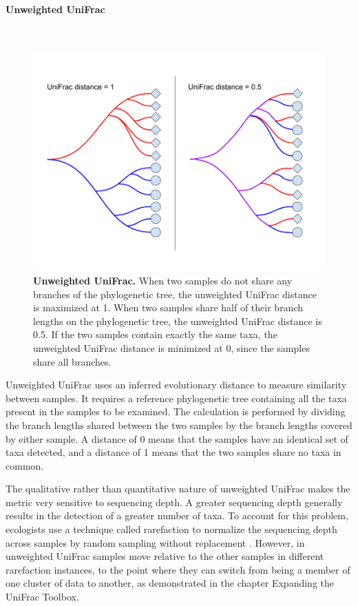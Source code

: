 \paragraph{Unweighted UniFrac}\mbox{}\\

\begin{figure}[h]
\begin{center}
\includegraphics[width=\textwidth]{unifrac.png}
\caption{\textbf{Unweighted UniFrac.} When two samples do not share any branches of the phylogenetic tree, the unweighted UniFrac distance is maximized at 1. When two samples share half of their branch lengths on the phylogenetic tree, the unweighted UniFrac distance is 0.5. If the two samples contain exactly the same taxa, the unweighted UniFrac distance is minimized at 0, since the samples share all branches.}
\end{center}
\end{figure}

Unweighted UniFrac uses an inferred evolutionary distance to measure similarity between samples. It requires a reference phylogenetic tree containing all the taxa present in the samples to be examined. The calculation is performed by dividing the branch lengths shared between the two samples by the branch lengths covered by either sample. A distance of 0 means that the samples have an identical set of taxa detected, and a distance of 1 means that the two samples share no taxa in common.

The qualitative rather than quantitative nature of unweighted UniFrac makes the metric very sensitive to sequencing depth. A greater sequencing depth generally results in the detection of a greater number of taxa. To account for this problem, ecologists use a technique called rarefaction to normalize the sequencing depth across samples by random sampling without replacement \cite{de2011evaluation}. However, in unweighted UniFrac samples move relative to the other samples in different rarefaction instances, to the point where they can switch from being a member of one cluster of data to another, as demonstrated in the chapter Expanding the UniFrac Toolbox.

